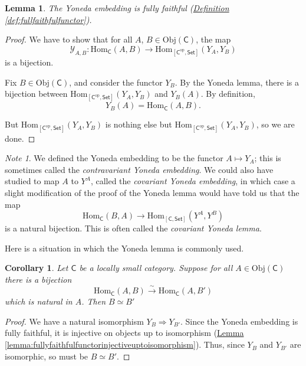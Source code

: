 \documentclass[a4paper]{report}
\newcommand{\Obj}{\mathrm{Obj}}
\newcommand{\Hom}{\mathrm{Hom}}
\theoremstyle{definition}
\theoremstyle{plain}
\newtheorem{lemma}{Lemma}[section]
\newtheorem{corollary}{Corollary}[section]
\theoremstyle{remark}
\newtheorem{note}{Note}[section]
\begin{document}
\begin{lemma}
  The Yoneda embedding is fully faithful (\hyperref[def:fullfaithfulfunctor]{Definition \ref*{def:fullfaithfulfunctor}}).
\end{lemma}
\begin{proof}
  We have to show that for all $A$, $B \in \Obj(\mathsf{C})$, the map
  \begin{equation*}
    \mathcal{Y}_{A, B}\colon \Hom_{\mathsf{C}}(A, B) \to \Hom_{[\mathsf{C}^{\mathrm{op}}, \mathsf{Set}]}(Y_{A}, Y_{B})
  \end{equation*}
  is a bijection.

  Fix $B \in \Obj(\mathsf{C})$, and consider the functor $Y_{B}$. By the Yoneda lemma, there is a bijection between $\Hom_{[\mathsf{C}^{\text{op}}, \mathsf{Set}]}(Y_{A}, Y_{B})$ and $Y_{B}(A)$. By definition,
  \begin{equation*}
    Y_{B}(A) = \Hom_{\mathsf{C}}(A, B).
  \end{equation*}

  But $\Hom_{[\mathsf{C}^{\text{op}}, \mathsf{Set}]}(Y_{A}, Y_{B})$ is nothing else but $\Hom_{[\mathsf{C}^{\mathrm{op}}, \mathsf{Set}]}(Y_{A}, Y_{B})$, so we are done.
\end{proof}

\begin{note}
  We defined the Yoneda embedding to be the functor $A \mapsto Y_{A}$; this is sometimes called the \emph{contravariant Yoneda embedding}. We could also have studied to map $A$ to $Y^{A}$, called the \emph{covariant Yoneda embedding}, in which case a slight modification of the proof of the Yoneda lemma would have told us that the map
  \begin{equation*}
    \Hom_{\mathsf{C}}(B, A) \to \Hom_{[\mathsf{C}, \mathsf{Set}]}(Y^{A}, Y^{B})
  \end{equation*}
  is a natural bijection. This is often called the \emph{covariant Yoneda lemma}.
\end{note}

Here is a situation in which the Yoneda lemma is commonly used.
\begin{corollary}
  \label{cor:yonedaembeddingrespectsisomorphisms}
  Let $\mathsf{C}$ be a locally small category. Suppose for all $A \in \Obj(\mathsf{C})$ there is a bijection
  \begin{equation*}
    \Hom_{\mathsf{C}}(A, B) \stackrel{\sim}{\to} \Hom_{\mathsf{C}}(A, B')
  \end{equation*}
  which is natural in $A$. Then $B \simeq B'$
\end{corollary}
\begin{proof}
  We have a natural isomorphism $Y_{B} \Rightarrow Y_{B'}$. Since the Yoneda embedding is fully faithful, it is injective on objects up to isomorphism (\hyperref[lemma:fullyfaithfulfunctorinjectiveuptoisomorphism]{Lemma \ref*{lemma:fullyfaithfulfunctorinjectiveuptoisomorphism}}). Thus, since $Y_{B}$ and $Y_{B'}$ are isomorphic, so must be $B \simeq B'$.
\end{proof}
\end{document}
